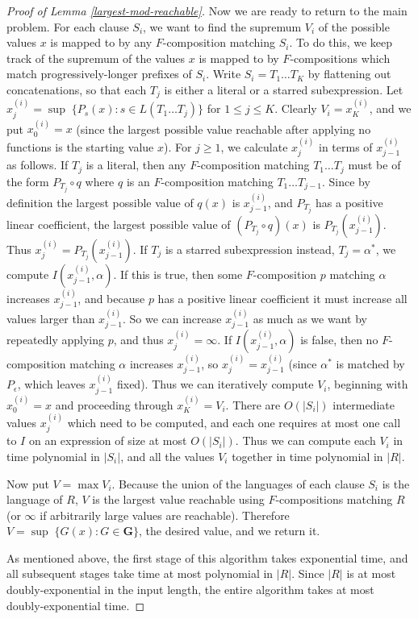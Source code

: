 \documentclass[11pt]{amsart}
\theoremstyle{definition}
\theoremstyle{remark}
\begin{document}
\begin{proof}[Proof of Lemma \ref{largest-mod-reachable}]
Now we are ready to return to the main problem. For each clause $S_i$, we want to find the supremum $V_i$ of the possible values $x$ is mapped to by any $F$-composition matching $S_i$. To do this, we keep track of the supremum of the values $x$ is mapped to by $F$-compositions which match progressively-longer prefixes of $S_i$. Write $S_i = T_1 \dots T_K$ by flattening out concatenations, so that each $T_j$ is either a literal or a starred subexpression. Let $x^{(i)}_j = \sup \; \{ P_s(x) : s \in L(T_1 \dots T_j) \}$ for $1 \le j \le K$. Clearly $V_i = x^{(i)}_K$, and we put $x^{(i)}_0 = x$ (since the largest possible value reachable after applying no functions is the starting value $x$). For $j \ge 1$, we calculate $x^{(i)}_j$ in terms of $x^{(i)}_{j-1}$ as follows. If $T_j$ is a literal, then any $F$-composition matching $T_1 \dots T_j$ must be of the form $P_{T_j} \circ q$ where $q$ is an $F$-composition matching $T_1 \dots T_{j-1}$. Since by definition the largest possible value of $q(x)$ is $x^{(i)}_{j-1}$, and $P_{T_j}$ has a positive linear coefficient, the largest possible value of $(P_{T_j} \circ q)(x)$ is $P_{T_j}(x^{(i)}_{j-1})$. Thus $x^{(i)}_j = P_{T_j}(x^{(i)}_{j-1})$. If $T_j$ is a starred subexpression instead, $T_j = \alpha^*$, we compute $I(x^{(i)}_{j-1}, \alpha)$. If this is true, then some $F$-composition $p$ matching $\alpha$ increases $x^{(i)}_{j-1}$, and because $p$ has a positive linear coefficient it must increase all values larger than $x^{(i)}_{j-1}$. So we can increase $x^{(i)}_{j-1}$ as much as we want by repeatedly applying $p$, and thus $x^{(i)}_j = \infty$. If $I(x^{(i)}_{j-1}, \alpha)$ is false, then no $F$-composition matching $\alpha$ increases $x^{(i)}_{j-1}$, so $x^{(i)}_j = x^{(i)}_{j-1}$ (since $\alpha^*$ is matched by $P_\epsilon$, which leaves $x^{(i)}_{j-1}$ fixed). Thus we can iteratively compute $V_i$, beginning with $x^{(i)}_0 = x$ and proceeding through $x^{(i)}_K = V_i$. There are $O(|S_i|)$ intermediate values $x^{(i)}_j$ which need to be computed, and each one requires at most one call to $I$ on an expression of size at most $O(|S_i|)$. Thus we can compute each $V_i$ in time polynomial in $|S_i|$, and all the values $V_i$ together in time polynomial in $|R|$.

Now put $V = \max V_i$. Because the union of the languages of each clause $S_i$ is the language of $R$, $V$ is the largest value reachable using $F$-compositions matching $R$ (or $\infty$ if arbitrarily large values are reachable). Therefore $V = \sup \; \{ G(x) : G \in \mathbf{G} \}$, the desired value, and we return it.

As mentioned above, the first stage of this algorithm takes exponential time, and all subsequent stages take time at most polynomial in $|R|$. Since $|R|$ is at most doubly-exponential in the input length, the entire algorithm takes at most doubly-exponential time.
\end{proof}
\end{document}

